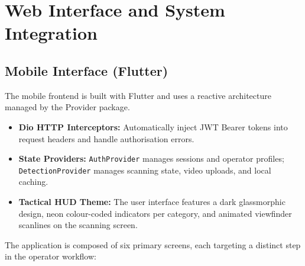 \section{Web Interface and System Integration}
\label{sec:ch4-interface}

\subsection{Mobile Interface (Flutter)}

The mobile frontend is built with Flutter and uses a reactive architecture managed by the Provider package.

\begin{itemize}
  \item \textbf{Dio HTTP Interceptors:} Automatically inject JWT Bearer tokens into request headers and handle authorisation errors.
  \item \textbf{State Providers:} \texttt{AuthProvider} manages sessions and operator profiles; \texttt{DetectionProvider} manages scanning state, video uploads, and local caching.
  \item \textbf{Tactical HUD Theme:} The user interface features a dark glassmorphic design, neon colour-coded indicators per category, and animated viewfinder scanlines on the scanning screen.
\end{itemize}

The application is composed of six primary screens, each targeting a distinct step in the operator workflow:

